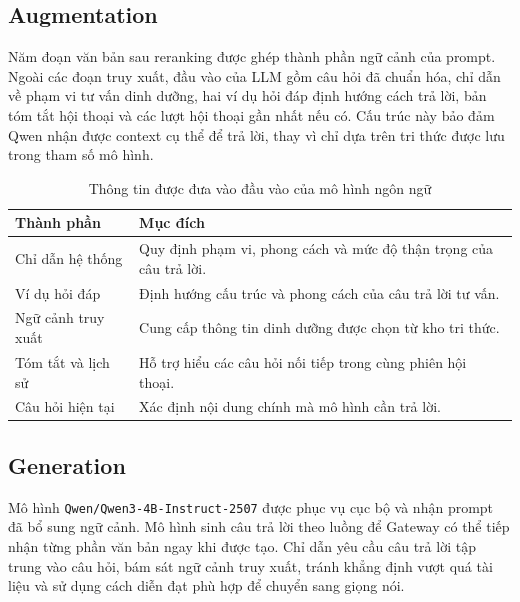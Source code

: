 \documentclass[a4paper,13pt,oneside]{report}
\begin{document}
\subsection{Augmentation}

Năm đoạn văn bản sau reranking được ghép thành phần ngữ cảnh của prompt. Ngoài các đoạn truy xuất, đầu vào của LLM gồm câu hỏi đã chuẩn hóa, chỉ dẫn về phạm vi tư vấn dinh dưỡng, hai ví dụ hỏi đáp định hướng cách trả lời, bản tóm tắt hội thoại và các lượt hội thoại gần nhất nếu có. Cấu trúc này bảo đảm Qwen nhận được context cụ thể để trả lời, thay vì chỉ dựa trên tri thức được lưu trong tham số mô hình.

\begin{table}[H]
    \centering
    \caption{Thông tin được đưa vào đầu vào của mô hình ngôn ngữ}
    \begin{tabular}{|p{4cm}|p{9.2cm}|}
        \hline
        \textbf{Thành phần} & \textbf{Mục đích}                                                  \\
        \hline
        Chỉ dẫn hệ thống    & Quy định phạm vi, phong cách và mức độ thận trọng của câu trả lời. \\
        \hline
        Ví dụ hỏi đáp       & Định hướng cấu trúc và phong cách của câu trả lời tư vấn.          \\
        \hline
        Ngữ cảnh truy xuất  & Cung cấp thông tin dinh dưỡng được chọn từ kho tri thức.           \\
        \hline
        Tóm tắt và lịch sử  & Hỗ trợ hiểu các câu hỏi nối tiếp trong cùng phiên hội thoại.       \\
        \hline
        Câu hỏi hiện tại    & Xác định nội dung chính mà mô hình cần trả lời.                    \\
        \hline
    \end{tabular}
\end{table}

\subsection{Generation}

Mô hình \texttt{Qwen/Qwen3-4B-Instruct-2507} được phục vụ cục bộ và nhận prompt đã bổ sung ngữ cảnh. Mô hình sinh câu trả lời theo luồng để Gateway có thể tiếp nhận từng phần văn bản ngay khi được tạo. Chỉ dẫn yêu cầu câu trả lời tập trung vào câu hỏi, bám sát ngữ cảnh truy xuất, tránh khẳng định vượt quá tài liệu và sử dụng cách diễn đạt phù hợp để chuyển sang giọng nói.
\end{document}

